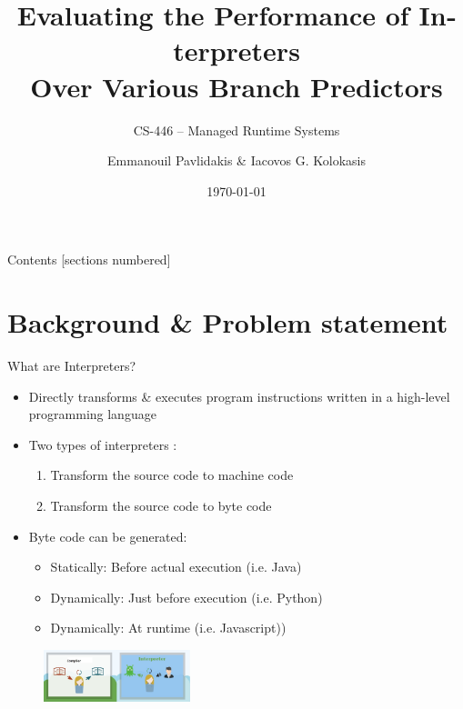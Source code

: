 \documentclass[10pt]{beamer}
\title{\textlatin{Evaluating the Performance of Interpreters\\Over Various Branch Predictors}}
\subtitle{CS-446 -- Managed Runtime Systems}
\date{\today}
\author{Emmanouil Pavlidakis \& Iacovos G. Kolokasis}
\institute{Computer Science Department \\ University Of Crete}
\begin{document}
{
\maketitle
}

{
\begin{frame}{Contents}
  [sections numbered]
  \tableofcontents[hideallsubsections]
\end{frame}
}

\section{Background \& Problem statement}

\begin{frame}{What are Interpreters?}
    \begin{itemize}
    	\item {Directly transforms \& executes program instructions written in a high-level programming language} 
    	\item {Two types of interpreters : }
    	\begin{enumerate}
    		\item {Transform the source code to machine code}
    		\item {Transform the source code to byte code}
    	\end{enumerate}	
        \item {Byte code can be generated: }
	         \begin{itemize}
	         	\item{Statically: Before actual execution (i.e. Java)}
	         	\item{Dynamically: Just before execution (i.e. Python)}
	         	\item{Dynamically: At runtime (i.e. Javascript))}
	         \end{itemize}
    \end{itemize}
    \begin{figure}
	    \includegraphics[height=1.5cm]{figures/interVSComp.jpg}
    \end{figure}
\end{frame}
\end{document}
